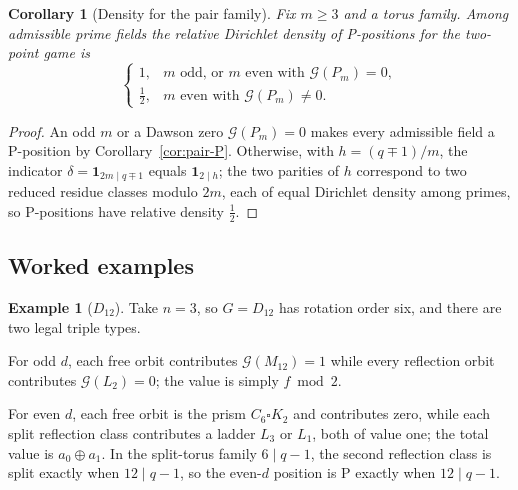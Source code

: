 \documentclass[11pt]{article}
\newtheorem{corollary}[theorem]{Corollary}
\theoremstyle{definition}
\newtheorem{example}[theorem]{Example}
\theoremstyle{remark}
\newcommand{\Grundy}{\mathcal{G}}
\newcommand{\Cyc}{C}
\newcommand{\Mob}{M}
\newif\ifdraftnotes
\newcommand{\phasenote}[2]{%
  \ifdraftnotes
    \par\smallskip\noindent
    \fbox{\parbox{0.96\linewidth}{\footnotesize\textbf{[#1 owed]}\ #2}}%
    \par\smallskip
  \fi}
\begin{document}
\begin{corollary}[Density for the pair family]
\label{cor:pair-density}
Fix $m\ge3$ and a torus family. Among admissible prime fields the relative Dirichlet density of
P-positions for the two-point game is
\begin{equation}
  \begin{cases}
    1, & m\text{ odd, or } m\text{ even with }\Grundy(P_m)=0,\\[2pt]
    \tfrac12, & m\text{ even with }\Grundy(P_m)\ne0 .
  \end{cases}
  \label{eq:pair-density}
\end{equation}
\end{corollary}

\begin{proof}
An odd $m$ or a Dawson zero $\Grundy(P_m)=0$ makes every admissible field a P-position by
Corollary~\ref{cor:pair-P}. Otherwise, with $h=(q\mp1)/m$, the indicator
$\delta=\mathbf 1_{2m\mid q\mp1}$ equals $\mathbf 1_{2\mid h}$; the two parities of $h$ correspond
to two reduced residue classes modulo $2m$, each of equal Dirichlet density among primes, so
P-positions have relative density $\tfrac12$.
\end{proof}

\subsection{Worked examples}

\begin{example}[$D_{12}$]
\label{ex:d12}
Take $n=3$, so $G=D_{12}$ has rotation order six, and there are two legal triple types.

For odd $d$, each free orbit contributes $\Grundy(\Mob_{12})=1$ while every reflection orbit
contributes $\Grundy(L_2)=0$; the value is simply $f\bmod2$.

For even $d$, each free orbit is the prism $\Cyc_6\square K_2$ and contributes zero, while each
split reflection class contributes a ladder $L_3$ or $L_1$, both of value one; the total value is
$a_0\oplus a_1$. In the split-torus family $6\mid q-1$, the second reflection class is split exactly
when $12\mid q-1$, so the even-$d$ position is P exactly when $12\mid q-1$.
\end{example}

\phasenote{C307}{Fable's answer~(6): keep the $D_{12}$ example and add one contrasting polyhedral
example, drawn from the $A_5$ rows, rather than replacing it. That example depends on the C290
congruence laws and is therefore owed by C307, not by the structural rebuild.}
\end{document}

